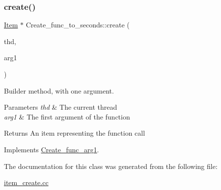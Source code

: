 \subsubsection{\texorpdfstring{create()}{create()}}
{\footnotesize\ttfamily \mbox{\hyperlink{classItem}{Item}} $\ast$ Create\+\_\+func\+\_\+to\+\_\+seconds\+::create (\begin{DoxyParamCaption}\item[{T\+HD $\ast$}]{thd,  }\item[{\mbox{\hyperlink{classItem}{Item}} $\ast$}]{arg1 }\end{DoxyParamCaption})\hspace{0.3cm}{\ttfamily [virtual]}}

Builder method, with one argument. 
\begin{DoxyParams}{Parameters}
{\em thd} & The current thread \\
\hline
{\em arg1} & The first argument of the function \\
\hline
\end{DoxyParams}
\begin{DoxyReturn}{Returns}
An item representing the function call 
\end{DoxyReturn}


Implements \mbox{\hyperlink{classCreate__func__arg1_a3e9a98f755cd82c3e762e334c955a8c9}{Create\+\_\+func\+\_\+arg1}}.



The documentation for this class was generated from the following file\+:\begin{DoxyCompactItemize}
\item 
\mbox{\hyperlink{item__create_8cc}{item\+\_\+create.\+cc}}\end{DoxyCompactItemize}
